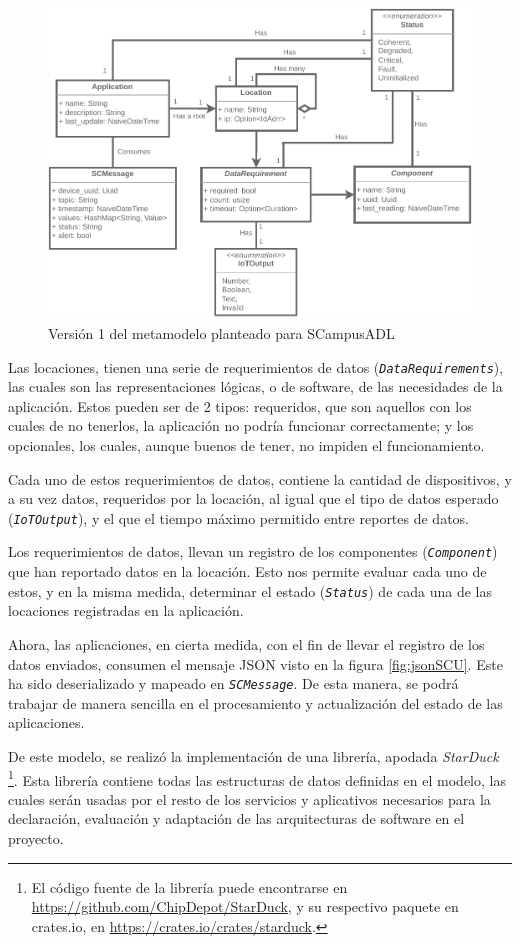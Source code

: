 \begin{figure}[ht]
    \caption{Versión 1 del metamodelo planteado para SCampusADL}
    \label{fig:metamodelo}
    \vspace{2mm}
    \includegraphics[width=\linewidth]{images/Metamodel B.pdf}
\end{figure}

Las locaciones, tienen una serie de requerimientos de datos (\texttt{\textit{DataRequirements}}), las cuales son las representaciones lógicas, o de software, de las necesidades de la aplicación. Estos pueden ser de 2 tipos: requeridos, que son aquellos con los cuales de no tenerlos, la aplicación no podría funcionar correctamente; y los opcionales, los cuales, aunque buenos de tener, no impiden el funcionamiento.

Cada uno de estos requerimientos de datos, contiene la cantidad de dispositivos, y a su vez datos, requeridos por la locación, al igual que el tipo de datos esperado (\textit{\texttt{IoTOutput}}), y el que el tiempo máximo permitido entre reportes de datos. 

Los requerimientos de datos, llevan un registro de los componentes (\textit{\texttt{Component}}) que han reportado datos en la locación. Esto nos permite evaluar cada uno de estos, y en la misma medida, determinar el estado (\textit{\texttt{Status}}) de cada una de las locaciones registradas en la aplicación.

Ahora, las aplicaciones, en cierta medida, con el fin de llevar el registro de los datos enviados, consumen el mensaje JSON visto en la figura \ref{fig:jsonSCU}. Este ha sido deserializado y mapeado en \textit{\texttt{SCMessage}}. De esta manera, se podrá trabajar de manera sencilla en el procesamiento y actualización del estado de las aplicaciones.

De este modelo, se realizó la implementación de una librería, apodada \textit{StarDuck} \footnote{El código fuente de la librería puede encontrarse en \url{https://github.com/ChipDepot/StarDuck}, y su respectivo paquete en crates.io, en \url{https://crates.io/crates/starduck}.}. Esta librería contiene todas las estructuras de datos definidas en el modelo, las cuales serán usadas por el resto de los servicios y aplicativos necesarios para la declaración, evaluación y adaptación de las arquitecturas de software en el proyecto. 
